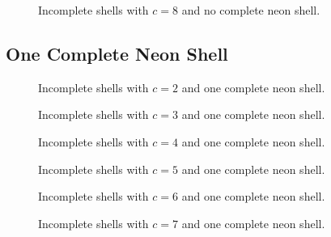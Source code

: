 \begin{figure}[!h]
\begin{minipage}{0.48\textwidth}
    \centering
    
    \caption{Incomplete shells with $c=8$ and no complete neon shell.}
    \label{incompl00-core08}
\end{minipage}
\hfill
\begin{minipage}{0.48\textwidth}
    \centering
\end{minipage}
\end{figure}

\vfill
\clearpage
\pagebreak

\subsection{One Complete Neon Shell}
\begin{figure}[h]
\begin{minipage}{0.48\textwidth}
    \centering
    
    \caption{Incomplete shells with $c=2$ and one complete neon shell.}
    \label{incompl01-core02}
\end{minipage}
\hfill
\begin{minipage}{0.48\textwidth}
    \centering
    
    \caption{Incomplete shells with $c=3$ and one complete neon shell.}
    \label{incompl01-core03}
\end{minipage}
\end{figure}

\begin{figure}[h]
\begin{minipage}{0.48\textwidth}
    \centering
    
    \caption{Incomplete shells with $c=4$ and one complete neon shell.}
    \label{incompl00-core01}
\end{minipage}
\hfill
\begin{minipage}{0.48\textwidth}
    \centering
    
    \caption{Incomplete shells with $c=5$ and one complete neon shell.}
    \label{incompl01-core05}
\end{minipage}
\end{figure}

\vspace{10cm}

\begin{figure}[h]
\begin{minipage}{0.48\textwidth}
    \centering
    
    \caption{Incomplete shells with $c=6$ and one complete neon shell.}
    \label{incompl01-core06}
\end{minipage}
\hfill
\begin{minipage}{0.48\textwidth}
    \centering
    
    \caption{Incomplete shells with $c=7$ and one complete neon shell.}
    \label{incompl01-core07}
\end{minipage}
\end{figure}

